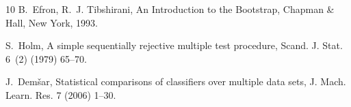 \documentclass[final,5p,twocolumn]{elsarticle}
\begin{document}
\begin{thebibliography}{10}
B.~Efron, R.~J. Tibshirani, An Introduction to the Bootstrap, Chapman \& Hall,
  New York, 1993.

S.~Holm, A simple sequentially rejective multiple test procedure, Scand. J. Stat. 6~(2) (1979) 65--70.

J.~Dem{\v{s}}ar, Statistical comparisons of classifiers over multiple data
  sets, J. Mach. Learn. Res. 7 (2006) 1--30.

\end{thebibliography}
\endgroup
\end{document}
